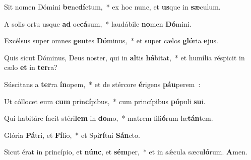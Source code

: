 ﻿\item Sit nomen Dómini \textbf{be}\-ne\textbf{dí}\-ctum,~* ex hoc nunc, et \textbf{us}\-que in \textbf{sæ}culum.
\item A solis ortu usque \textbf{ad} oc\textbf{cá}\-sum,~* laudábile \textbf{no}\-men \textbf{Dó}mini.
\item Excélsus super omnes \textbf{gen}\-tes \textbf{Dó}\-minus,~* et super cælos \textbf{gló}\-ri\-a \textbf{e}jus.
\item Quis sicut Dóminus, Deus noster, qui in \textbf{al}\-tis \textbf{há}\-bitat,~* et humília réspicit in cælo \textbf{et} in \textbf{ter}ra?
\item Súscitans a \textbf{ter}\-ra \textbf{ín}\-opem,~* et de stércore \textbf{é}\-rigens \textbf{páu}perem~:
\item Ut cóllocet eum \textbf{cum} prin\textbf{cí}\-pibus,~* cum princípibus \textbf{pó}\-pu\-li \textbf{su}i.
\item Qui habitáre facit stéri\textbf{lem} in \textbf{do}\-mo,~* matrem fili\textbf{ó}\-rum læ\textbf{tán}tem.
\item Glória \textbf{Pá}\-tri, et \textbf{Fí}\-lio,~* et Spi\textbf{rí}\-tui \textbf{Sán}cto.
\item Sicut érat in princípio, et \textbf{núnc}, et \textbf{sém}\-per,~* et in sǽcula sæcu\textbf{ló}\-rum. \textbf{A}men.
